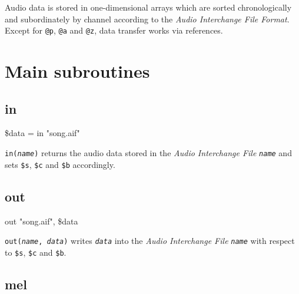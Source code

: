 \documentclass[a4paper, 10pt]{article}
\begin{document}
	Audio data is stored in one-dimensional arrays which are sorted chronologically and subordinately by channel according to the {\it Audio Interchange File Format}. Except for \texttt{@p}, \texttt{@a} and \texttt{@z}, data transfer works via references.

	\section{Main subroutines}

	\subsection{in}

	\begin{center} \ttfamily
		\$data = in "song.aif"
	\end{center}
	\texttt{in(\textit{name})} returns the audio data stored in the \textit{Audio Interchange File} \texttt{\textit{name}} and sets \texttt{\$s}, \texttt{\$c} and \texttt{\$b} accordingly.

	\subsection{out}

	\begin{center} \ttfamily
		out "song.aif", \$data
	\end{center}
	\texttt{out(\textit{name}, \textit{data})} writes \texttt{\textit{data}} into the \textit{Audio Interchange File} \texttt{\textit{name}} with respect to \texttt{\$s}, \texttt{\$c} and \texttt{\$b}.

	\subsection{mel}
\end{document}
